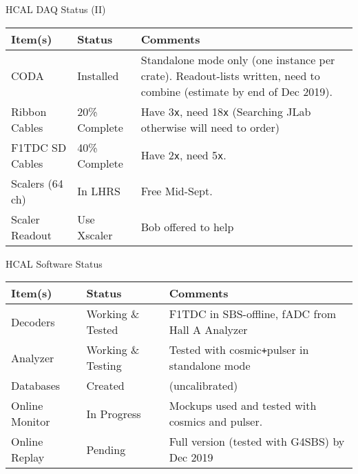 \documentclass[10pt]{beamer}
\newcommand{\itemsheader}{\bfseries{Item(s)} & \bfseries{Status} & \bfseries{Comments}}
\newcommand{\hcal}{HCAL}
\newcommand{\Rplus}{\texttt{+}}
\newcommand{\Rx}{\texttt{x}}
\newcommand{\xtimes}[1]{#1{\Rx}}
\begin{document}
\begin{frame}{{\hcal} DAQ Status (II)}

	\begin{table}[t]
	\centering
	\begin{tabular}{|ll>{\raggedright\arraybackslash}p{4.5cm}|}
	\hline
	\itemsheader\\
	\hline
	CODA & Installed & Standalone mode only (one instance per crate). Readout-lists written, need to combine (estimate by end of Dec 2019).\\
	\hline
	Ribbon Cables & 20\% Complete & Have \xtimes{3}, need \xtimes{18} (Searching JLab otherwise will need to order)\\
	\hline
	F1TDC SD Cables & 40\% Complete & Have \xtimes{2}, need \xtimes{5}. \\
	\hline
	Scalers (64 ch)  & In LHRS & Free Mid-Sept.\\
	\hline
	Scaler Readout & Use Xscaler & Bob offered to help\\
	\hline
	\end{tabular}
	\label{tab:status}
	\end{table}
\end{frame}

\begin{frame}{{\hcal} Software Status}
	\begin{table}[t]
	\centering
	\begin{tabular}{|ll>{\raggedright\arraybackslash}p{4.5cm}|}
	\hline
	\itemsheader\\
	\hline
	Decoders & Working \& Tested & F1TDC in SBS-offline, fADC from Hall A Analyzer\\
	\hline
	Analyzer & Working \& Testing & Tested with cosmic{\Rplus}pulser in standalone mode \\
	\hline
	Databases & Created & (uncalibrated)\\
	\hline
	Online Monitor & In Progress & Mockups used and tested with cosmics and pulser.\\
	\hline
	Online Replay & Pending & Full version (tested with G4SBS) by Dec 2019\\
	\hline
	\end{tabular}
	\label{tab:status}
	\end{table}
\end{frame}
\end{document}
